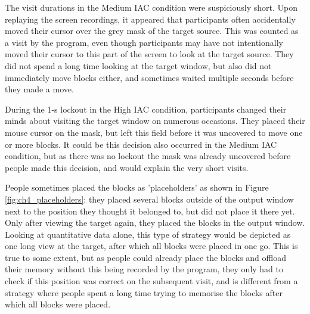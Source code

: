 The visit durations in the Medium IAC condition were suspiciously short. Upon replaying the screen recordings, it appeared that participants often accidentally moved their cursor over the grey mask of the target source. This was counted as a visit by the program, even though participants may have not intentionally moved their cursor to this part of the screen to look at the target source. They did not spend a long time looking at the target window, but also did not immediately move blocks either, and sometimes waited multiple seconds before they made a move. 

During the 1-s lockout in the High IAC condition, participants changed their minds about visiting the target window on numerous occasions. They placed their mouse cursor on the mask, but left this field before it was uncovered to move one or more blocks. It could be this decision also occurred in the Medium IAC condition, but as there was no lockout the mask was already uncovered before people made this decision, and would explain the very short visits.

People sometimes placed the blocks as 'placeholders' as shown in Figure \ref{fig:ch4_placeholders}: they placed several blocks outside of the output window next to the position they thought it belonged to, but did not place it there yet. Only after viewing the target again, they placed the blocks in the output window. Looking at quantitative data alone, this type of strategy would be depicted as one long view at the target, after which all blocks were placed in one go. This is true to some extent, but as people could already place the blocks and offload their memory without this being recorded by the program, they only had to check if this position was correct on the subsequent visit, and is different from a strategy where people spent a long time trying to memorise the blocks after which all blocks were placed.

